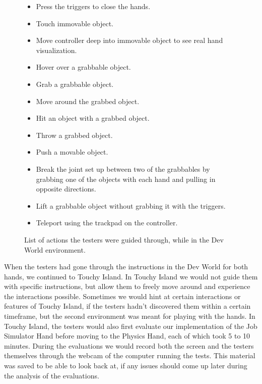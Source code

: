 \begin{figure}[h]
\begin{itemize}[noitemsep]
\item Press the triggers to close the hands.
\item Touch immovable object.
\item Move controller deep into immovable object to see real hand visualization.
\item Hover over a grabbable object.
\item Grab a grabbable object.
\item Move around the grabbed object.
\item Hit an object with a grabbed object.
\item Throw a grabbed object.
\item Push a movable object.
\item Break the joint set up between two of the grabbables by grabbing one of the objects with each hand and pulling in opposite directions.
\item Lift a grabbable object without grabbing it with the triggers.
\item Teleport using the trackpad on the controller.
\end{itemize}
\caption{List of actions the testers were guided through, while in the Dev World environment.}
\label{fig:listActionsDevWorld}
\end{figure}

When the testers had gone through the instructions in the Dev World for both hands, we continued to Touchy Island. In Touchy Island we would not guide them with specific instructions, but allow them to freely move around and experience the interactions possible. Sometimes we would hint at certain interactions or features of Touchy Island, if the testers hadn't discovered them within a certain timeframe, but the second environment was meant for playing with the hands. In Touchy Island, the testers would also first evaluate our implementation of the Job Simulator Hand before moving to the Physics Hand, each of which took 5 to 10 minutes. During the evaluations we would record both the screen and the testers themselves through the webcam of the computer running the tests. This material was saved to be able to look back at, if any issues should come up later during the analysis of the evaluations.

